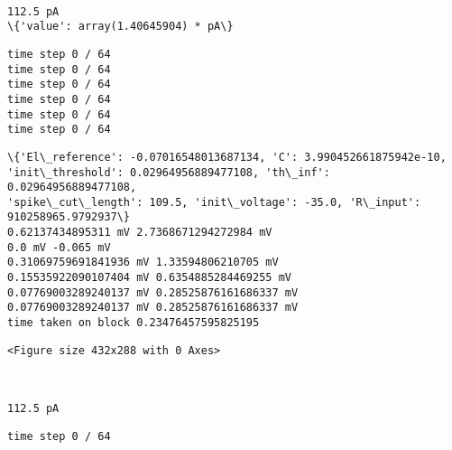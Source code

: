 \documentclass[11pt]{article}
\begin{document}
    
    \begin{center}
    \end{center}
    { \hspace*{\fill} \\}
    
    \begin{Verbatim}[commandchars=\\\{\}]
112.5 pA
\{'value': array(1.40645904) * pA\}
    \end{Verbatim}

    \begin{Verbatim}[commandchars=\\\{\}]
time step 0 / 64
time step 0 / 64
time step 0 / 64
time step 0 / 64
time step 0 / 64
time step 0 / 64
    \end{Verbatim}

    \begin{Verbatim}[commandchars=\\\{\}]
\{'El\_reference': -0.07016548013687134, 'C': 3.990452661875942e-10,
'init\_threshold': 0.02964956889477108, 'th\_inf': 0.02964956889477108,
'spike\_cut\_length': 109.5, 'init\_voltage': -35.0, 'R\_input': 910258965.9792937\}
0.62137434895311 mV 2.7368671294272984 mV
0.0 mV -0.065 mV
0.31069759691841936 mV 1.33594806210705 mV
0.15535922090107404 mV 0.6354885284469255 mV
0.07769003289240137 mV 0.28525876161686337 mV
0.07769003289240137 mV 0.28525876161686337 mV
time taken on block 0.23476457595825195
    \end{Verbatim}

    
    \begin{verbatim}
<Figure size 432x288 with 0 Axes>
    \end{verbatim}

    
    \begin{center}
    \end{center}
    { \hspace*{\fill} \\}
    
    \begin{Verbatim}[commandchars=\\\{\}]
112.5 pA
    \end{Verbatim}

    \begin{Verbatim}[commandchars=\\\{\}]
time step 0 / 64
    \end{Verbatim}
\end{document}
